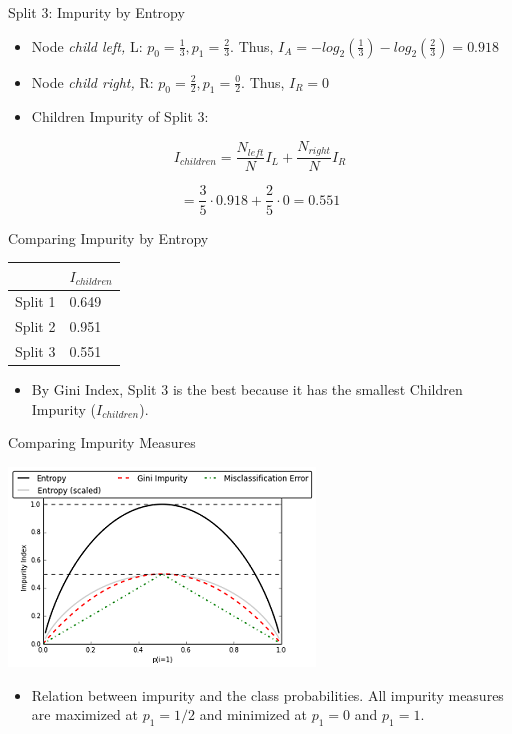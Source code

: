 \documentclass[
  ignorenonframetext,
]{beamer}
\providecommand{\tightlist}{%
  \setlength{\itemsep}{0pt}\setlength{\parskip}{0pt}}
\begin{document}
\begin{frame}{Split 3: Impurity by Entropy}
\protect\hypertarget{split-3-impurity-by-entropy-1}{}

\begin{itemize}
\item
  Node \emph{child left,} L: \(p_0 = \frac{1}{3}, p_1 = \frac{2}{3}\).
  Thus, \(I_{A} = -log_2(\frac{1}{3}) -log_2(\frac{2}{3}) = 0.918\)
\item
  Node \emph{child right,} R: \(p_0 = \frac{2}{2}, p_1 = \frac{0}{2}\).
  Thus, \(I_{R} = 0\)
\item
  Children Impurity of Split 3:
\end{itemize}

\[
I_{children} =  \frac{N_{left}}{N}I_{L} + \frac{N_{right}}{N}I_{R}
\]

\[                            = \frac{3}{5} \cdot 0.918 + \frac{2}{5} \cdot 0 = 0.551\]

\end{frame}

\begin{frame}{Comparing Impurity by Entropy}
\protect\hypertarget{comparing-impurity-by-entropy}{}

\begin{longtable}[]{@{}ll@{}}
\toprule
& \(I_{children}\)\tabularnewline
\midrule
\endhead
Split 1 & 0.649\tabularnewline
Split 2 & 0.951\tabularnewline
Split 3 & 0.551\tabularnewline
\bottomrule
\end{longtable}

\begin{itemize}
\tightlist
\item
  By Gini Index, Split 3 is the best because it has the smallest
  Children Impurity (\(I_{children}\)).
\end{itemize}

\end{frame}

\begin{frame}{Comparing Impurity Measures}
\protect\hypertarget{comparing-impurity-measures}{}

\includegraphics{images2/i.png}

\begin{itemize}
\tightlist
\item
  Relation between impurity and the class probabilities. All impurity
  measures are maximized at \textbf{\(p_1 =1/2\)} and minimized at
  \textbf{\(p_1 = 0\)} and \textbf{\(p_1=1\)}.\\
\end{itemize}

\end{frame}
\end{document}
